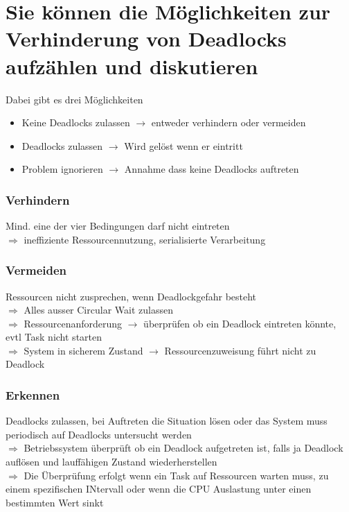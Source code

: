 \documentclass{report}
\theoremstyle{definition}
\theoremstyle{example}
\begin{document}
\section{Sie können die Möglichkeiten zur Verhinderung von Deadlocks aufzählen und diskutieren}
Dabei gibt es drei Möglichkeiten
\begin{itemize}
	\item Keine Deadlocks zulassen $\rightarrow$ entweder verhindern oder vermeiden
	\item Deadlocks zulassen $\rightarrow$ Wird gelöst wenn er eintritt
	\item Problem ignorieren $\rightarrow$ Annahme dass keine Deadlocks auftreten
\end{itemize}

\subsubsection{Verhindern} 
Mind. eine der vier Bedingungen darf nicht eintreten\\
$\Rightarrow$ ineffiziente Ressourcennutzung, serialisierte Verarbeitung\\

\subsubsection{Vermeiden} 
Ressourcen nicht zusprechen, wenn Deadlockgefahr besteht\\ 
$\Rightarrow$ Alles ausser Circular Wait zulassen\\
$\Rightarrow$ Ressourcenanforderung $\rightarrow$ überprüfen ob ein Deadlock eintreten könnte, evtl Task nicht starten\\
$\Rightarrow$ System in sicherem Zustand $\rightarrow$ Ressourcenzuweisung führt nicht zu Deadlock
\subsubsection{Erkennen} 
Deadlocks zulassen, bei Auftreten die Situation lösen oder das System muss periodisch auf Deadlocks untersucht werden\\
$\Rightarrow$ Betriebssystem überprüft ob ein Deadlock aufgetreten ist, falls ja Deadlock auflösen und lauffähigen Zustand wiederherstellen\\
$\Rightarrow$ Die Überprüfung erfolgt wenn ein Task auf Ressourcen warten muss, zu einem spezifischen INtervall oder wenn die CPU Auslastung unter einen bestimmten Wert sinkt\\
\end{document}
